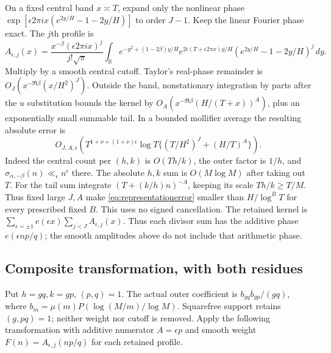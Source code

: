\documentclass[11pt]{article}
\theoremstyle{remark}
\newcommand{\R}{\mathbb R}
\begin{document}
On a fixed central band $x\asymp T$, expand only the nonlinear phase
$\exp[\epsilon2\pi ix(e^{2y/H}-1-2y/H)]$ to order $J-1$.
Keep the linear Fourier phase exact. The $j$th profile is
\[
 A_{\epsilon,j}(x)=\frac{x^{-\beta}(\epsilon2\pi ix)^j}{j!\sqrt\pi}
 \int_\R e^{-y^2+(1-2\beta)y/H}
 e^{2i(T+\epsilon2\pi x)y/H}(e^{2y/H}-1-2y/H)^j\,dy.
\]
Multiply by a smooth central cutoff. Taylor's real-phase remainder is
$O_J(x^{-\Re\beta}(x/H^2)^J)$. Outside the band, nonstationary
integration by parts after the $u$ substitution bounds the kernel by
$O_A(x^{-\Re\beta}(H/(T+x))^A)$, plus an exponentially small summable
tail. In a bounded mollifier average the resulting absolute error is
\begin{equation}\label{eq:representationerror}
 O_{J,A,\epsilon}\left(T^{1+\nu+(1+\nu)\epsilon}\log T
       \{(T/H^2)^J+(H/T)^A\}\right).
\end{equation}
Indeed the central count per $(h,k)$ is $O(Th/k)$, the outer factor is
$1/h$, and $\sigma_{\alpha,-\beta}(n)\ll_\epsilon n^\epsilon$ there.
The absolute $h,k$ sum is $O(M\log M)$ after taking out $T$.
For the tail sum integrate $(T+(k/h)n)^{-A}$, keeping its scale
$Th/k\ge T/M$. Thus fixed large $J,A$ make
\eqref{eq:representationerror} smaller than $H/\log^B T$ for every
prescribed fixed $B$. This uses no signed cancellation.
The retained kernel is
$\sum_{\epsilon=\pm1}e(\epsilon x)\sum_{j<J}A_{\epsilon,j}(x)$.
Thus each divisor sum has the additive phase $e(\epsilon np/q)$;
the smooth amplitudes above do not include that arithmetic phase.

\subsection{Composite transformation, with both residues}
Put $h=gq,k=gp$, $(p,q)=1$. The actual outer coefficient is
$b_{gq}\overline b_{gp}/(gq)$, where $b_m=\mu(m)P(\log(M/m)/\log M)$.
Squarefree support retains $(g,pq)=1$; neither weight nor cutoff is removed.
Apply the following transformation with additive numerator $A=\epsilon p$
and smooth weight $F(n)=A_{\epsilon,j}(np/q)$ for each retained profile.
\end{document}
